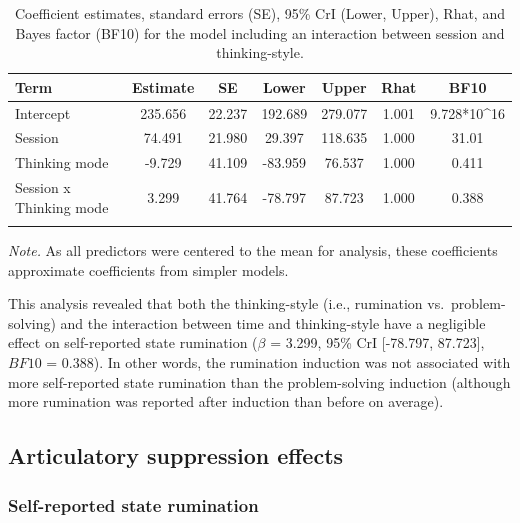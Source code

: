 \documentclass[a4paper,12pt,twoside,openright,oldfontcommands,final]{memoir}
\begin{document}
\begin{table}[H]
\begin{center}
\begin{threeparttable}
\caption{\label{tab:ParamInteraction}Coefficient estimates, standard errors (SE), 95\% CrI (Lower, Upper), Rhat, and Bayes factor (BF10) for the model including an interaction between session and thinking-style.}
\small{
\begin{tabular}{lcccccc}
\toprule
Term & \multicolumn{1}{c}{Estimate} & \multicolumn{1}{c}{SE} & \multicolumn{1}{c}{Lower} & \multicolumn{1}{c}{Upper} & \multicolumn{1}{c}{Rhat} & \multicolumn{1}{c}{BF10}\\
\midrule
Intercept & 235.656 & 22.237 & 192.689 & 279.077 & 1.001 & 9.728*10\textasciicircum{}16\\
Session & 74.491 & 21.980 & 29.397 & 118.635 & 1.000 & 31.01\\
Thinking mode & -9.729 & 41.109 & -83.959 & 76.537 & 1.000 & 0.411\\
Session x Thinking mode & 3.299 & 41.764 & -78.797 & 87.723 & 1.000 & 0.388\\
\bottomrule
\addlinespace
\end{tabular}
}
\begin{tablenotes}[para]
\textit{Note.} As all predictors were centered to the mean for analysis, these coefficients approximate coefficients from simpler models.
\end{tablenotes}
\end{threeparttable}
\end{center}
\end{table}

This analysis revealed that both the thinking-style (i.e., rumination vs.~problem-solving) and the interaction between time and thinking-style have a negligible effect on self-reported state rumination (\(\beta\) = 3.299, 95\% CrI {[}-78.797, 87.723{]}, \(BF10\) = 0.388). In other words, the rumination induction was not associated with more self-reported state rumination than the problem-solving induction (although more rumination was reported after induction than before on average).

\hypertarget{articulatory-suppression-effects-2}{%
\subsection{Articulatory suppression effects}\label{articulatory-suppression-effects-2}}

\hypertarget{self-reported-state-rumination}{%
\subsubsection{Self-reported state rumination}\label{self-reported-state-rumination}}
\end{document}
